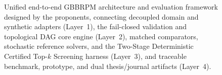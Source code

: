 \begin{figure}[H]
{\begin{tikzpicture}
\end{tikzpicture}}
\caption{Unified end-to-end GBBRPM architecture and evaluation framework designed by the proponents, connecting decoupled domain and synthetic adapters (Layer~1), the fail-closed validation and topological DAG core engine (Layer~2), matched comparators, stochastic reference solvers, and the Two-Stage Deterministic Certified Top-$k$ Screening harness (Layer~3), and traceable benchmark, prototype, and dual thesis/journal artifacts (Layer~4).}
\label{fig:unified_architecture}
\end{figure}
